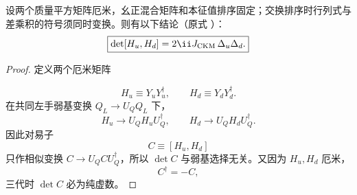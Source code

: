 \begin{proposition}
设两个质量平方矩阵厄米，幺正混合矩阵和本征值排序固定；交换排序时行列式与差乘积的符号须同时变换。则有以下结论（原式 ）：
\begin{equation*}
 \boxed{\det[H_u,H_d]=2\ii J_{\rm CKM}\,\Delta_u\Delta_d.}
\end{equation*}
\end{proposition}
\begin{proof}
定义两个厄米矩阵

\begin{equation*}
 H_u\equiv Y_uY_u^\dagger,
 \qquad
 H_d\equiv Y_dY_d^\dagger.
\end{equation*}
在共同左手弱基变换 $Q_L\to U_QQ_L$ 下，
\begin{equation*}
 H_u\to U_QH_uU_Q^\dagger,
 \qquad
 H_d\to U_QH_dU_Q^\dagger.
\end{equation*}
因此对易子
\begin{equation*}
 C\equiv[H_u,H_d]
\end{equation*}
只作相似变换 $C\to U_QCU_Q^\dagger$，所以 $\det C$ 与弱基选择无关。又因为 $H_u,H_d$ 厄米，
\begin{equation*}
 C^\dagger=-C,
\end{equation*}
三代时 $\det C$ 必为纯虚数。


\end{proof}
